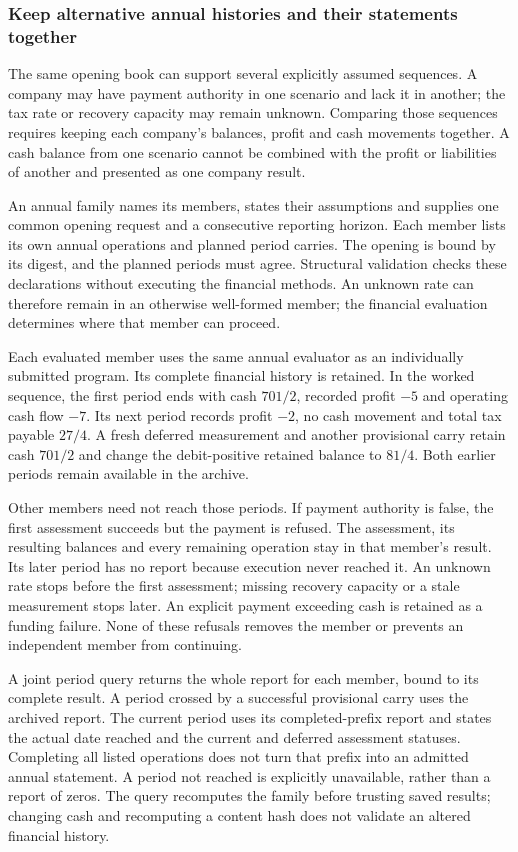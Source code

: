 
\subsubsection*{Keep alternative annual histories and their statements together}
The same opening book can support several explicitly assumed sequences. A
company may have payment authority in one scenario and lack it in another;
the tax rate or recovery capacity may remain unknown. Comparing those
sequences requires keeping each company's balances, profit and cash movements
together. A cash balance from one scenario cannot be combined with the profit
or liabilities of another and presented as one company result.

An annual family names its members, states their assumptions and supplies one
common opening request and a consecutive reporting horizon. Each member lists
its own annual operations and planned period carries. The opening is bound by
its digest, and the planned periods must agree. Structural validation checks
these declarations without executing the financial methods. An unknown rate
can therefore remain in an otherwise well-formed member; the financial
evaluation determines where that member can proceed.

Each evaluated member uses the same annual evaluator as an individually
submitted program. Its complete financial history is retained. In the worked
sequence, the first period ends with cash $701/2$, recorded profit $-5$ and
operating cash flow $-7$. Its next period records profit $-2$, no cash movement
and total tax payable $27/4$. A fresh deferred measurement and another
provisional carry retain cash $701/2$ and change the debit-positive retained
balance to $81/4$. Both earlier periods remain available in the archive.

Other members need not reach those periods. If payment authority is false,
the first assessment succeeds but the payment is refused. The assessment,
its resulting balances and every remaining operation stay in that member's
result. Its later period has no report because execution never reached it.
An unknown rate stops before the first assessment; missing recovery capacity
or a stale measurement stops later. An explicit payment exceeding cash is
retained as a funding failure. None of these refusals removes the member or
prevents an independent member from continuing.

A joint period query returns the whole report for each member, bound to its
complete result. A period crossed by a successful provisional carry uses the
archived report. The current period uses its completed-prefix report and
states the actual date reached and the current and deferred assessment
statuses. Completing all listed operations does not turn that prefix into
an admitted annual statement. A period not reached is explicitly unavailable,
rather than a report of zeros. The query recomputes the family before trusting
saved results; changing cash and recomputing a content hash does not validate
an altered financial history.

